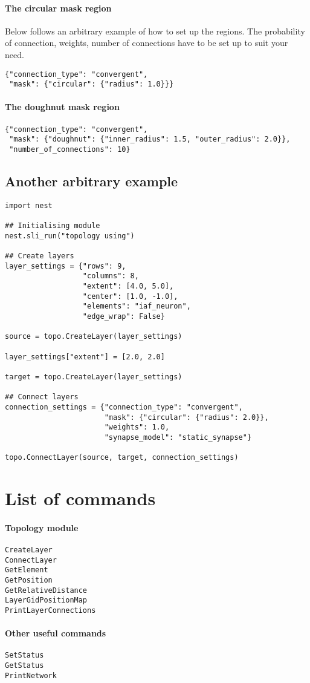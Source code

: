 \documentclass{article}
\begin{document}
\paragraph{The circular mask region}

Below follows an arbitrary example of how to set up the regions. The probability of connection, weights, number of connections have to be set up to suit your need. 

\begin{verbatim}
{"connection_type": "convergent",
 "mask": {"circular": {"radius": 1.0}}}
\end{verbatim}

\paragraph{The doughnut mask region}
\begin{verbatim}
{"connection_type": "convergent",
 "mask": {"doughnut": {"inner_radius": 1.5, "outer_radius": 2.0}},
 "number_of_connections": 10}
\end{verbatim}

\subsection{Another arbitrary example}

\begin{verbatim}
import nest

## Initialising module
nest.sli_run("topology using")

## Create layers
layer_settings = {"rows": 9,
                  "columns": 8,
                  "extent": [4.0, 5.0],
                  "center": [1.0, -1.0],
                  "elements": "iaf_neuron",
                  "edge_wrap": False}

source = topo.CreateLayer(layer_settings)

layer_settings["extent"] = [2.0, 2.0]

target = topo.CreateLayer(layer_settings)

## Connect layers
connection_settings = {"connection_type": "convergent",
                       "mask": {"circular": {"radius": 2.0}},
                       "weights": 1.0,
                       "synapse_model": "static_synapse"}

topo.ConnectLayer(source, target, connection_settings) 
\end{verbatim}

\section{List of commands}

\paragraph{Topology module}

\begin{verbatim}
CreateLayer
ConnectLayer
GetElement
GetPosition
GetRelativeDistance
LayerGidPositionMap
PrintLayerConnections
\end{verbatim}

\paragraph{Other useful commands}

\begin{verbatim}
SetStatus
GetStatus
PrintNetwork
\end{verbatim}
\end{document}
